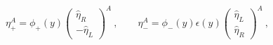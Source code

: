 \begin{equation} 
       \eta_+^A=\phi_+(y)\left(\begin{array}{c}\hat{\eta}_R\\-\hat{\eta}_L\end{array}\right)^A\ ,\qquad\eta_-^A=\phi_-(y)\epsilon(y)\left(\begin{array}{c}\hat{\eta}_L\\\hat{\eta}_R\end{array}\right)^A\ ,
       \end{equation} 

